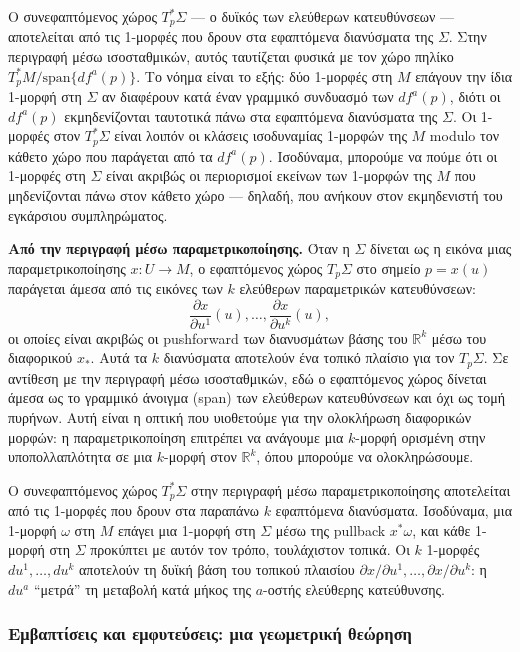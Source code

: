 \documentclass[12pt]{article}
\begin{document}
Ο συνεφαπτόμενος χώρος $T_p^*\Sigma$ --- ο δυϊκός των ελεύθερων κατευθύνσεων --- αποτελείται από τις 1-μορφές που δρουν στα εφαπτόμενα διανύσματα της $\Sigma$. Στην περιγραφή μέσω ισοσταθμικών, αυτός ταυτίζεται φυσικά με τον χώρο πηλίκο $T_p^*M / \text{span}\{df^a(p)\}$. Το νόημα είναι το εξής: δύο 1-μορφές στη $M$ επάγουν την ίδια 1-μορφή στη $\Sigma$ αν διαφέρουν κατά έναν γραμμικό συνδυασμό των $df^a(p)$, διότι οι $df^a(p)$ εκμηδενίζονται ταυτοτικά πάνω στα εφαπτόμενα διανύσματα της $\Sigma$. Οι 1-μορφές στον $T_p^*\Sigma$ είναι λοιπόν οι κλάσεις ισοδυναμίας 1-μορφών της $M$ modulo τον κάθετο χώρο που παράγεται από τα $df^a(p)$. Ισοδύναμα, μπορούμε να πούμε ότι οι 1-μορφές στη $\Sigma$ είναι ακριβώς οι περιορισμοί εκείνων των 1-μορφών της $M$ που μηδενίζονται πάνω στον κάθετο χώρο --- δηλαδή, που ανήκουν στον εκμηδενιστή του εγκάρσιου συμπληρώματος.

\textbf{Από την περιγραφή μέσω παραμετρικοποίησης.} Όταν η $\Sigma$ δίνεται ως η εικόνα μιας παραμετρικοποίησης $x: U \to M$, ο εφαπτόμενος χώρος $T_p\Sigma$ στο σημείο $p = x(u)$ παράγεται άμεσα από τις εικόνες των $k$ ελεύθερων παραμετρικών κατευθύνσεων:
\[
\frac{\partial x}{\partial u^1}(u), \dots, \frac{\partial x}{\partial u^k}(u),
\]
οι οποίες είναι ακριβώς οι pushforward των διανυσμάτων βάσης του $\mathbb{R}^k$ μέσω του διαφορικού $x_*$. Αυτά τα $k$ διανύσματα αποτελούν ένα τοπικό πλαίσιο για τον $T_p\Sigma$. Σε αντίθεση με την περιγραφή μέσω ισοσταθμικών, εδώ ο εφαπτόμενος χώρος δίνεται άμεσα ως το γραμμικό άνοιγμα (span) των ελεύθερων κατευθύνσεων και όχι ως τομή πυρήνων. Αυτή είναι η οπτική που υιοθετούμε για την ολοκλήρωση διαφορικών μορφών: η παραμετρικοποίηση επιτρέπει να ανάγουμε μια $k$-μορφή ορισμένη στην υποπολλαπλότητα σε μια $k$-μορφή στον $\mathbb{R}^k$, όπου μπορούμε να ολοκληρώσουμε.

Ο συνεφαπτόμενος χώρος $T_p^*\Sigma$ στην περιγραφή μέσω παραμετρικοποίησης αποτελείται από τις 1-μορφές που δρουν στα παραπάνω $k$ εφαπτόμενα διανύσματα. Ισοδύναμα, μια 1-μορφή $\omega$ στη $M$ επάγει μια 1-μορφή στη $\Sigma$ μέσω της pullback $x^*\omega$, και κάθε 1-μορφή στη $\Sigma$ προκύπτει με αυτόν τον τρόπο, τουλάχιστον τοπικά. Οι $k$ 1-μορφές $du^1, \dots, du^k$ αποτελούν τη δυϊκή βάση του τοπικού πλαισίου $\partial x / \partial u^1, \dots, \partial x / \partial u^k$: η $du^a$ ``μετρά'' τη μεταβολή κατά μήκος της $a$-οστής ελεύθερης κατεύθυνσης.

\subsubsection{Εμβαπτίσεις και εμφυτεύσεις: μια γεωμετρική θεώρηση}
\end{document}
